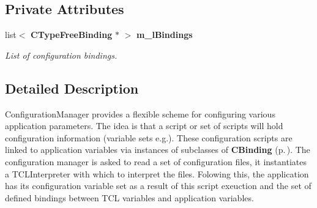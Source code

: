 \subsection*{Private Attributes}
\begin{CompactItemize}
\item 
list$<$ {\bf CType\-Free\-Binding} $\ast$ $>$ {\bf m\_\-l\-Bindings}
\begin{CompactList}\small\item\em List of configuration bindings.\item\end{CompactList}\end{CompactItemize}


\subsection{Detailed Description}
Configuration\-Manager provides a flexible scheme for configuring  various application parameters. The idea is that a script or set of scripts will hold configuration information (variable sets e.g.). These configuration scripts are linked to application variables via instances of subclasses of {\bf CBinding} {\rm (p.\,\pageref{classCBinding})}. The configuration manager is asked to read a set of configuration files, it instantiates a TCLInterpreter with which to interpret the files. Folowing this, the application has its configuration variable set as a result of this script exeuction and the set of defined bindings between TCL variables and application variables.

